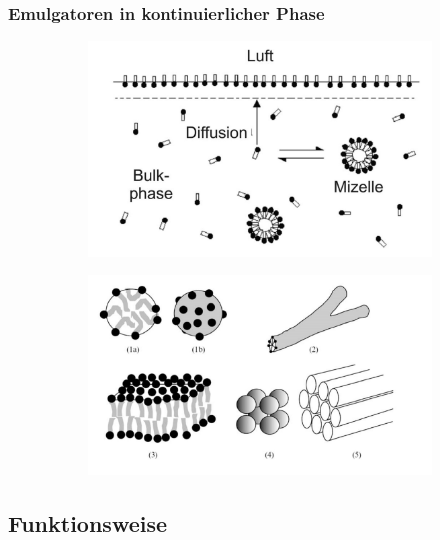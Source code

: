 \documentclass{beamer} %
\begin{document}
\begin{frame}
\frametitle{Emulgatoren in kontinuierlicher Phase}
\begin{figure}[H]
\centering
\begin{subfigure}[c]{0.5\textwidth}
\centering
\includegraphics[width = 1\textwidth]{BulkPhase.JPG}
\end{subfigure}
\begin{subfigure}[c]{0.45\textwidth}
\centering
\includegraphics[width = 1\textwidth]{Mizellenarten.JPG}
\end{subfigure}
\end{figure}
\end{frame}

\subsection{Funktionsweise}
\end{document}
